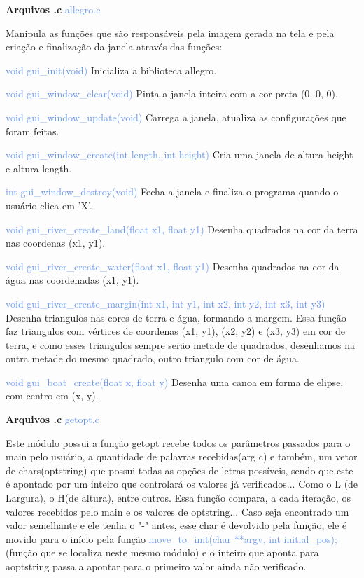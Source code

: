 \documentclass[a4paper,12pt]{article}
\begin{document}
\newpage %

{\Large \textcolor{NavyBlue}{ \textbf{Arquivos .c  }}}{\large \textcolor{CornflowerBlue}{  allegro.c}}
\bigskip

Manipula as funções que são responsáveis pela imagem gerada na tela e pela criação e finalização da janela através
das funções:

{\textcolor{CornflowerBlue}{void gui\_init(void)}} Inicializa a biblioteca allegro. 

{\textcolor{CornflowerBlue}{void gui\_window\_clear(void)}} Pinta a janela inteira com a cor preta (0, 0, 0).  

{\textcolor{CornflowerBlue}{void gui\_window\_update(void)}} Carrega a janela, atualiza as configurações que foram feitas.
 
{\textcolor{CornflowerBlue}{void gui\_window\_create(int length, int height)}} Cria uma janela de altura height e altura length. 

{\textcolor{CornflowerBlue}{int gui\_window\_destroy(void)}} Fecha a janela e finaliza o programa quando o usuário clica em 'X'.

{\textcolor{CornflowerBlue}{void gui\_river\_create\_land(float x1, float y1)}} Desenha quadrados na cor da terra nas 
coordenas (x1, y1).

{\textcolor{CornflowerBlue}{void gui\_river\_create\_water(float x1, float y1)}} Desenha quadrados na cor da água nas
coordenadas (x1, y1). 

{\textcolor{CornflowerBlue}{void gui\_river\_create\_margin(int x1, int y1, int x2, int y2, int x3, int y3)}} Desenha triangulos 
nas cores de terra e água, formando a margem. Essa função faz triangulos com vértices de coordenas (x1, y1), (x2, y2) e (x3, y3) 
em cor de terra, e como esses triangulos sempre serão metade de quadrados, desenhamos na outra metade do mesmo quadrado,
 outro triangulo com cor de água.

{\textcolor{CornflowerBlue}{void gui\_boat\_create(float x, float y)}} Desenha uma canoa em forma de elipse, com centro em (x, y).


\bigskip
\bigskip
\bigskip
\bigskip
\bigskip

{\Large \textcolor{NavyBlue}{ \textbf{Arquivos .c  }}}{\large \textcolor{CornflowerBlue}{  getopt.c}}
\bigskip

Este módulo possui a função getopt recebe todos os parâmetros passados para o main pelo usuário, a quantidade de palavras recebidas(arg c) e também, um vetor de chars(optstring) que possui todas as opções de letras possíveis, sendo que este é apontado por um inteiro que controlará os valores já verificados... Como o L (de Largura), o H(de altura), entre outros. Essa função compara, a cada iteração, os valores recebidos pelo main e os valores de optstring... Caso seja encontrado um valor semelhante e ele tenha o "-" antes, esse char é devolvido pela função, ele é movido para o início pela função {\textcolor{CornflowerBlue}{move\_to\_init(char **argv, int initial\_pos);}} (função que se localiza neste mesmo módulo) e o inteiro que aponta para aoptstring passa a apontar para o primeiro valor ainda não verificado.
\end{document}
